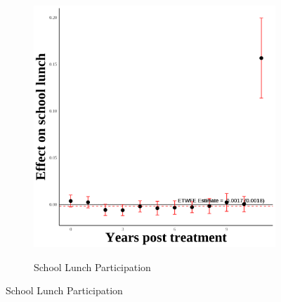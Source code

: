 \documentclass[12pt,english]{article}
\begin{document}
\begin{figure}[H]
\begin{subfigure}[b]{0.3\textwidth}
    \label{fig:ln-schl-lunch-secgen-hh}
  \end{subfigure}
  \hfill
  \begin{subfigure}[b]{0.3\textwidth}
    \centering
    \caption{School Lunch Participation}
    \includegraphics[width=\linewidth]{figures/plot28-schl_lunch_event_study-secgen-hh.png}
    \label{fig:schl-lunch-secgen-hh}
  \end{subfigure}

  \vspace{0.3cm} %


\end{figure}
\end{document}
